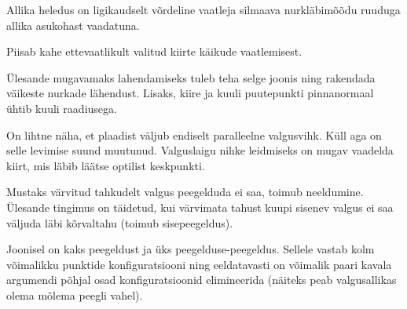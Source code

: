 \documentclass[10pt]{article}
\begin{document}
{%

\hint
Allika heledus on ligikaudselt võrdeline vaatleja silmaava nurkläbimõõdu ruuduga allika asukohast vaadatuna.
\probend
\bigskip


\hint
Piisab kahe ettevaatlikult valitud kiirte käikude vaatlemisest.
\probend
\bigskip


\hint
Ülesande mugavamaks lahendamiseks tuleb teha selge joonis ning rakendada väikeste nurkade lähendust. Lisaks, kiire ja kuuli puutepunkti pinnanormaal ühtib kuuli raadiusega.
\probend
\bigskip


\hint
On lihtne näha, et plaadist väljub endiselt paralleelne valgusvihk. Küll aga on selle levimise suund muutunud. Valguslaigu nihke leidmiseks on mugav vaadelda kiirt, mis läbib läätse optilist keskpunkti.
\probend
\bigskip


\hint
Mustaks värvitud tahkudelt valgus peegelduda ei saa, toimub neeldumine. Ülesande tingimus on täidetud, kui värvimata tahust kuupi sisenev valgus ei saa
väljuda läbi kõrvaltahu (toimub sisepeegeldus).
\probend
\bigskip


\hint
Joonisel on kaks peegeldust ja üks peegelduse-peegeldus. Sellele vastab kolm võimalikku punktide konfiguratsiooni ning eeldatavasti on võimalik paari kavala argumendi põhjal osad konfiguratsioonid elimineerida (näiteks peab valgusallikas olema mõlema peegli vahel).
\probend
\bigskip


}
\end{document}
